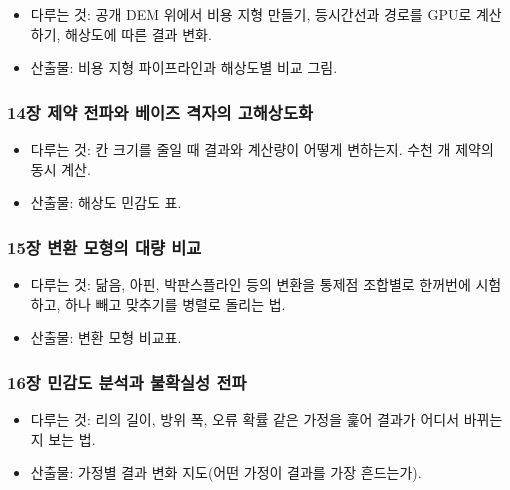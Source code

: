\begin{itemize}
\tightlist
\item
  다루는 것: 공개 DEM 위에서 비용 지형 만들기, 등시간선과 경로를 GPU로 계산하기, 해상도에 따른 결과 변화.
\item
  산출물: 비용 지형 파이프라인과 해상도별 비교 그림.
\end{itemize}

\hypertarget{uxc7a5-uxc81cuxc57d-uxc804uxd30cuxc640-uxbca0uxc774uxc988-uxaca9uxc790uxc758-uxace0uxd574uxc0c1uxb3c4uxd654}{%
\subsubsection{14장 제약 전파와 베이즈 격자의 고해상도화}\label{uxc7a5-uxc81cuxc57d-uxc804uxd30cuxc640-uxbca0uxc774uxc988-uxaca9uxc790uxc758-uxace0uxd574uxc0c1uxb3c4uxd654}}

\begin{itemize}
\tightlist
\item
  다루는 것: 칸 크기를 줄일 때 결과와 계산량이 어떻게 변하는지. 수천 개 제약의 동시 계산.
\item
  산출물: 해상도 민감도 표.
\end{itemize}

\hypertarget{uxc7a5-uxbcc0uxd658-uxbaa8uxd615uxc758-uxb300uxb7c9-uxbe44uxad50}{%
\subsubsection{15장 변환 모형의 대량 비교}\label{uxc7a5-uxbcc0uxd658-uxbaa8uxd615uxc758-uxb300uxb7c9-uxbe44uxad50}}

\begin{itemize}
\tightlist
\item
  다루는 것: 닮음, 아핀, 박판스플라인 등의 변환을 통제점 조합별로 한꺼번에 시험하고, 하나 빼고 맞추기를 병렬로 돌리는 법.
\item
  산출물: 변환 모형 비교표.
\end{itemize}

\hypertarget{uxc7a5-uxbbfcuxac10uxb3c4-uxbd84uxc11duxacfc-uxbd88uxd655uxc2e4uxc131-uxc804uxd30c}{%
\subsubsection{16장 민감도 분석과 불확실성 전파}\label{uxc7a5-uxbbfcuxac10uxb3c4-uxbd84uxc11duxacfc-uxbd88uxd655uxc2e4uxc131-uxc804uxd30c}}

\begin{itemize}
\tightlist
\item
  다루는 것: 리의 길이, 방위 폭, 오류 확률 같은 가정을 훑어 결과가 어디서 바뀌는지 보는 법.
\item
  산출물: 가정별 결과 변화 지도(어떤 가정이 결과를 가장 흔드는가).
\end{itemize}

